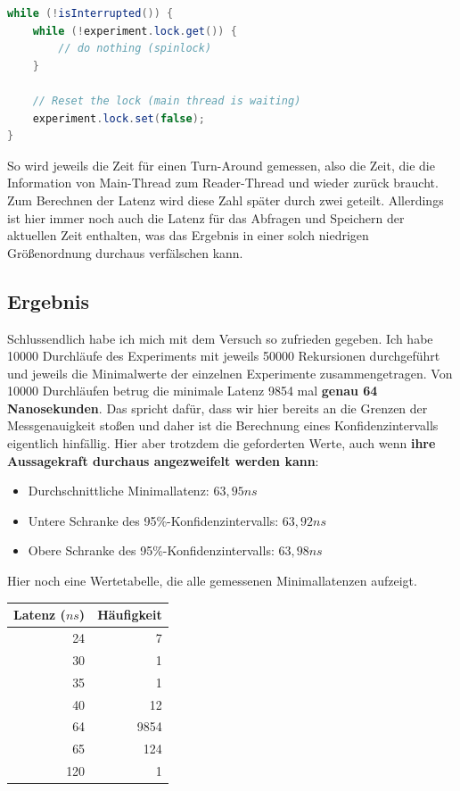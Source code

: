 \documentclass[12pt]{article}
\begin{document}
\begin{lstlisting}[language=java,caption={Spinlocks: Reader Thread (optimiert)}]
while (!isInterrupted()) {
	while (!experiment.lock.get()) {
		// do nothing (spinlock)
	}
	
	// Reset the lock (main thread is waiting)
	experiment.lock.set(false);
}
\end{lstlisting}

So wird jeweils die Zeit für einen Turn-Around gemessen, also die Zeit, die die Information von Main-Thread zum Reader-Thread und wieder zurück braucht.
Zum Berechnen der Latenz wird diese Zahl später durch zwei geteilt.
Allerdings ist hier immer noch auch die Latenz für das Abfragen und Speichern der aktuellen Zeit enthalten, was das Ergebnis in einer solch niedrigen Größenordnung durchaus verfälschen kann.

\subsection{Ergebnis}
Schlussendlich habe ich mich mit dem Versuch so zufrieden gegeben.
Ich habe 10000 Durchläufe des Experiments mit jeweils 50000 Rekursionen durchgeführt und jeweils die Minimalwerte der einzelnen Experimente zusammengetragen.
Von 10000 Durchläufen betrug die minimale Latenz 9854 mal \textbf{genau 64 Nanosekunden}.
Das spricht dafür, dass wir hier bereits an die Grenzen der Messgenauigkeit stoßen und daher ist die Berechnung eines Konfidenzintervalls eigentlich hinfällig. Hier aber trotzdem die geforderten Werte, auch wenn \textbf{ihre Aussagekraft durchaus angezweifelt werden kann}:
\begin{itemize}
	\item Durchschnittliche Minimallatenz: $63,95 ns$
	\item Untere Schranke des 95\%-Konfidenzintervalls: $63,92 ns$
	\item Obere Schranke des 95\%-Konfidenzintervalls: $63,98 ns$
\end{itemize}

Hier noch eine Wertetabelle, die alle gemessenen Minimallatenzen aufzeigt.

\begin{table}[H]
	\centering
	\label{tab:latencies}
	\begin{tabular}{|r|r|}
		\hline
		Latenz ($ns$) & Häufigkeit \\
		\hline
		24 & 7 \\
		30 & 1 \\
		35 & 1 \\
		40 & 12 \\
		64 & 9854 \\
		65 & 124 \\
		120 & 1 \\
		\hline
	\end{tabular}
\end{table}
\end{document}
